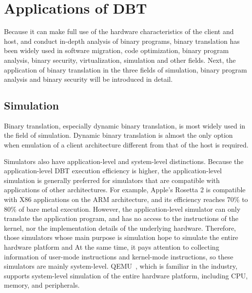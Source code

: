 \section{Applications of DBT}
\label{sec:applications}

Because it can make full use of the hardware characteristics of the client and host, and conduct in-depth analysis of binary programs, binary translation has been widely used in software migration, code optimization, binary program analysis, binary security, virtualization, simulation and other fields.
Next, the application of binary translation in the three fields of simulation, binary program analysis and binary security will be introduced in detail.

\subsection{Simulation}
Binary translation, especially dynamic binary translation, is most widely used in the field of simulation.
Dynamic binary translation is almost the only option when emulation of a client architecture different from that of the host is required.

Simulators also have application-level and system-level distinctions.
Because the application-level DBT execution efficiency is higher, the application-level simulation is generally preferred for simulators that are compatible with applications of other architectures.
For example, Apple's Rosetta 2 is compatible with X86 applications on the ARM architecture, and its efficiency reaches 70\% to 80\% of bare metal execution.
However, the application-level simulator can only translate the application program, and has no access to the instructions of the kernel, nor the implementation details of the underlying hardware.
Therefore, those simulators whose main purpose is simulation hope to simulate the entire hardware platform and At the same time, it pays attention to collecting information of user-mode instructions and kernel-mode instructions, so these simulators are mainly system-level.
QEMU~\cite{DBLP:conf/usenix/Bellard05}, which is familiar in the industry, supports system-level simulation of the entire hardware platform, including CPU, memory, and peripherals.

